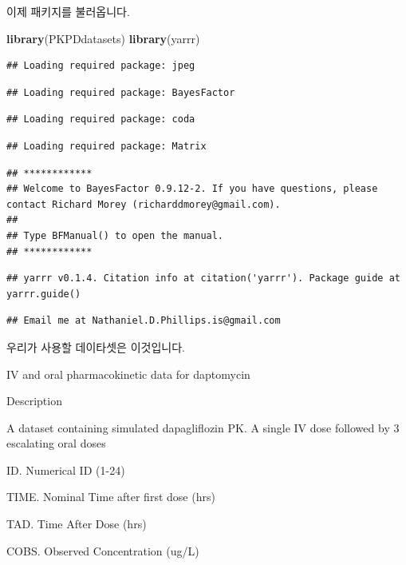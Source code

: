 \documentclass[12pt,]{krantz}
\makeatletter
\newenvironment{Shaded}{\begin{snugshade}}{\end{snugshade}}
\newcommand{\KeywordTok}[1]{\textcolor[rgb]{0.13,0.29,0.53}{\textbf{#1}}}
\newcommand{\NormalTok}[1]{#1}
\newenvironment{kframe}{%
\medskip{}
\setlength{\fboxsep}{.8em}
 \def\at@end@of@kframe{}%
 \ifinner\ifhmode%
  \def\at@end@of@kframe{\end{minipage}}%
  \begin{minipage}{\columnwidth}%
 \fi\fi%
 \def\FrameCommand##1{\hskip\@totalleftmargin \hskip-\fboxsep
 \colorbox{shadecolor}{##1}\hskip-\fboxsep
     \hskip-\linewidth \hskip-\@totalleftmargin \hskip\columnwidth}%
 \MakeFramed {\advance\hsize-\width
   \@totalleftmargin\z@ \linewidth\hsize
   \@setminipage}}%
 {\par\unskip\endMakeFramed%
 \at@end@of@kframe}
\renewenvironment{Shaded}{\begin{kframe}}{\end{kframe}}
\theoremstyle{definition}
\theoremstyle{definition}
\theoremstyle{remark}
\makeatother
\begin{document}
이제 패키지를 불러옵니다.

\begin{Shaded}
\begin{Highlighting}[]
\KeywordTok{library}\NormalTok{(PKPDdatasets)}
\KeywordTok{library}\NormalTok{(yarrr)}
\end{Highlighting}
\end{Shaded}

\begin{verbatim}
## Loading required package: jpeg
\end{verbatim}

\begin{verbatim}
## Loading required package: BayesFactor
\end{verbatim}

\begin{verbatim}
## Loading required package: coda
\end{verbatim}

\begin{verbatim}
## Loading required package: Matrix
\end{verbatim}

\begin{verbatim}
## ************
## Welcome to BayesFactor 0.9.12-2. If you have questions, please contact Richard Morey (richarddmorey@gmail.com).
## 
## Type BFManual() to open the manual.
## ************
\end{verbatim}

\begin{verbatim}
## yarrr v0.1.4. Citation info at citation('yarrr'). Package guide at yarrr.guide()
\end{verbatim}

\begin{verbatim}
## Email me at Nathaniel.D.Phillips.is@gmail.com
\end{verbatim}

우리가 사용할 데이타셋은 이것입니다.

IV and oral pharmacokinetic data for daptomycin

Description

A dataset containing simulated dapagliflozin PK. A single IV dose
followed by 3 escalating oral doses

ID. Numerical ID (1-24)

TIME. Nominal Time after first dose (hrs)

TAD. Time After Dose (hrs)

COBS. Observed Concentration (ug/L)
\end{document}
